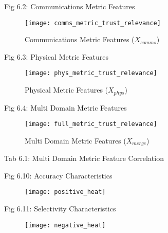 \documentclass[aspectratio=43]{beamer}
\begin{document}
\begin{frame}{Fig 6.2: Communications Metric Features}

\begin{figure}[h!]
	\centering

	\texttt{[image: comms\_metric\_trust\_relevance]}
	\caption{Communications Metric Features ($X_{comms}$)}
	\label{fig:comms_feature_extraction}
\end{figure}
\end{frame}
\begin{frame}{Fig 6.3: Physical Metric Features}
	
\begin{figure}[h!]
	\centering
	\texttt{[image: phys\_metric\_trust\_relevance]}
	\caption{Physical Metric Features ($X_{phys}$)}
	\label{fig:phys_feature_extraction}
\end{figure}
\end{frame}
\begin{frame}{Fig 6.4: Multi Domain  Metric Features}
	
\begin{figure}[h!]
	\centering
	\texttt{[image: full\_metric\_trust\_relevance]}
	\caption{Multi Domain  Metric Features ($X_{merge}$)}
	\label{fig:multi_feature_extraction}
\end{figure}
\end{frame}
\begin{frame}{Tab 6.1: Multi Domain Metric Feature Correlation}
	
\begin{table}
	\centering
	\caption{Multi Domain Metric Feature Correlation ($X_{merge}$)}
	\label{tab:full_metric_correlations}
\end{table}
\end{frame}

\begin{frame}{Fig 6.10: Accuracy Characteristics}
	\begin{figure}
		\centering
		\texttt{[image: positive\_heat]}
		\label{fig:positive_heat}
	\end{figure}
\end{frame}
\begin{frame}{Fig 6.11: Selectivity Characteristics}
	\begin{figure}
		\centering
		\texttt{[image: negative\_heat]}
		\label{fig:negative_heat}
	\end{figure}
\end{frame}
\end{document}
